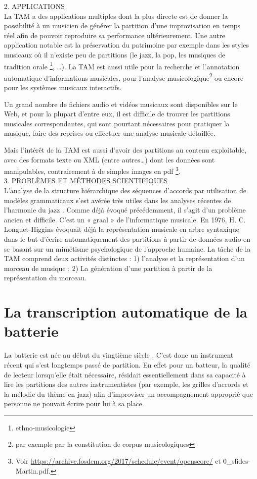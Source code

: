 2. APPLICATIONS\\
La TAM a des applications multiples \cite{future_directions} dont la plus
directe est de donner la possibilité à un musicien de générer la partition
d’une improvisation en temps réel afin de pouvoir reproduire sa performance
ultérieurement. Une autre application notable est la préservation du patrimoine
par exemple dans les styles musicaux où il n’existe peu de partitions (le
jazz, la pop, les musiques de tradition orale \footnote{ethno-musicologie}, …).
La TAM est aussi utile pour la recherche et l’annotation automatique
d’informations musicales, pour l’analyse musicologique\footnote{par exemple
par la constitution de corpus musicologiques} ou encore pour les systèmes
musicaux interactifs.

Un grand nombre de fichiers audio et vidéos musicaux sont disponibles sur le
Web, et pour la plupart d’entre eux, il est difficile de trouver les partitions
musicales correspondantes, qui sont pourtant nécessaires pour pratiquer la
musique, faire des reprises ou effectuer une analyse musicale détaillée.


Mais l’intérêt de la TAM est aussi d’avoir des partitions au contenu
exploitable, avec des formats texte ou XML (entre autres…) dont les données
sont manipulables, contrairement à de simples images en pdf
\footnote{Voir \url{https://archive.fosdem.org/2017/schedule/event/openscore/}
    et 0\_slides-Martin.pdf.}.\\

3. PROBLÈMES ET MÉTHODES SCIENTIFIQUES\\
L’analyse de la structure hiérarchique des séquences d’accords par utilisation
de modèles grammaticaux s’est avérée très utiles dans les analyses récentes de
l’harmonie du jazz \cite{harasimjazz}. Comme déjà évoqué précédemment, il
s’agit d’un problème ancien et difficile. C’est un « graal » de l’informatique
musicale. En 1976, H. C. Longuet-Higgins \cite{first_one} évoquait déjà la
représentation musicale en arbre syntaxique dans le but d’écrire
automatiquement des partitions à partir de données audio en se basant sur un
mimétisme psychologique de l’approche humaine.
La tâche de la TAM comprend deux activités distinctes : 1) l’analyse et la
représentation d’un morceau de musique ; 2) La génération d’une partition à
partir de la représentation du morceau.
 
\section{La transcription automatique de la batterie}
La batterie est née au début du vingtième siècle \cite{histoire_drum_1}. C’est
donc un instrument récent qui s’est longtemps passé de partition. En effet
pour un batteur, la qualité de lecteur lorsqu’elle était nécessaire,
résidait essentiellement dans sa capacité à lire les partitions des autres
instrumentistes (par exemple, les grilles d’accords et la mélodie du thème en
jazz) afin d’improviser un accompagnement approprié que personne ne pouvait
écrire pour lui à sa place.
 
